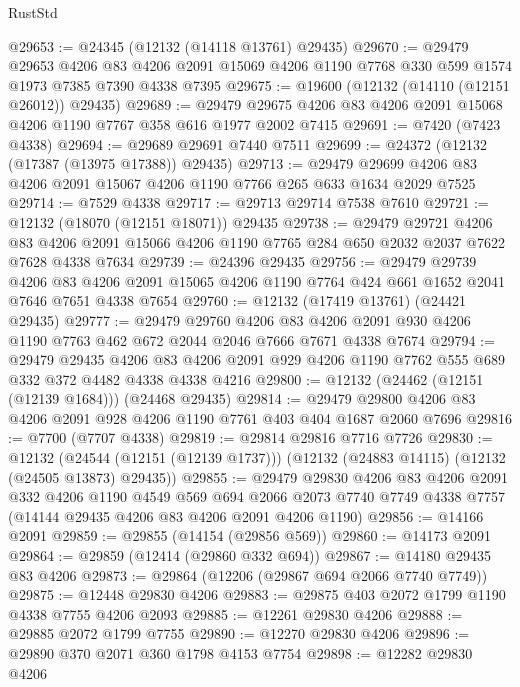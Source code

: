 \begin{lexlean}{RustStd}
\begin{coremodule}
@29653 := @24345 (@12132 (@14118 @13761) @29435)
@29670 := @29479
    @29653
    @4206
    @83
    @4206
    @2091
    @15069
    @4206
    @1190
    @7768
    @330
    @599
    @1574
    @1973
    @7385
    @7390
    @4338
    @7395
@29675 := @19600 (@12132 (@14110 (@12151 @26012)) @29435)
@29689 := @29479 @29675 @4206 @83 @4206 @2091 @15068 @4206 @1190 @7767 @358 @616 @1977 @2002 @7415
@29691 := @7420 (@7423 @4338)
@29694 := @29689 @29691 @7440 @7511
@29699 := @24372 (@12132 (@17387 (@13975 @17388)) @29435)
@29713 := @29479 @29699 @4206 @83 @4206 @2091 @15067 @4206 @1190 @7766 @265 @633 @1634 @2029 @7525
@29714 := @7529 @4338
@29717 := @29713 @29714 @7538 @7610
@29721 := @12132 (@18070 (@12151 @18071)) @29435
@29738 := @29479
    @29721
    @4206
    @83
    @4206
    @2091
    @15066
    @4206
    @1190
    @7765
    @284
    @650
    @2032
    @2037
    @7622
    @7628
    @4338
    @7634
@29739 := @24396 @29435
@29756 := @29479
    @29739
    @4206
    @83
    @4206
    @2091
    @15065
    @4206
    @1190
    @7764
    @424
    @661
    @1652
    @2041
    @7646
    @7651
    @4338
    @7654
@29760 := @12132 (@17419 @13761) (@24421 @29435)
@29777 := @29479
    @29760
    @4206
    @83
    @4206
    @2091
    @930
    @4206
    @1190
    @7763
    @462
    @672
    @2044
    @2046
    @7666
    @7671
    @4338
    @7674
@29794 := @29479
    @29435
    @4206
    @83
    @4206
    @2091
    @929
    @4206
    @1190
    @7762
    @555
    @689
    @332
    @372
    @4482
    @4338
    @4338
    @4216
@29800 := @12132 (@24462 (@12151 (@12139 @1684))) (@24468 @29435)
@29814 := @29479 @29800 @4206 @83 @4206 @2091 @928 @4206 @1190 @7761 @403 @404 @1687 @2060 @7696
@29816 := @7700 (@7707 @4338)
@29819 := @29814 @29816 @7716 @7726
@29830 := @12132
    (@24544 (@12151 (@12139 @1737)))
    (@12132 (@24883 @14115) (@12132 (@24505 @13873) @29435))
@29855 := @29479
    @29830
    @4206
    @83
    @4206
    @2091
    @332
    @4206
    @1190
    @4549
    @569
    @694
    @2066
    @2073
    @7740
    @7749
    @4338
    @7757
    (@14144 @29435 @4206 @83 @4206 @2091 @4206 @1190)
@29856 := @14166 @2091
@29859 := @29855 (@14154 (@29856 @569))
@29860 := @14173 @2091
@29864 := @29859 (@12414 (@29860 @332 @694))
@29867 := @14180 @29435 @83 @4206
@29873 := @29864 (@12206 (@29867 @694 @2066 @7740 @7749))
@29875 := @12448 @29830 @4206
@29883 := @29875 @403 @2072 @1799 @1190 @4338 @7755 @4206 @2093
@29885 := @12261 @29830 @4206
@29888 := @29885 @2072 @1799 @7755
@29890 := @12270 @29830 @4206
@29896 := @29890 @370 @2071 @360 @1798 @4153 @7754
@29898 := @12282 @29830 @4206

\end{coremodule}
\end{lexlean}

